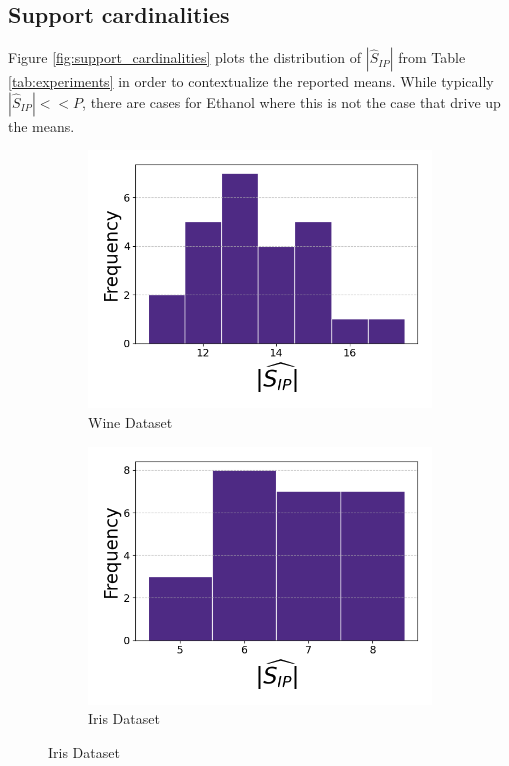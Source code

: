 \newpage

\subsection{Support cardinalities}
\label{sec:support_cardinalities}

Figure \ref{fig:support_cardinalities} plots the distribution of $|\widehat{S}_{IP}|$ from Table \ref{tab:experiments} in order to contextualize the reported means.
While typically $|\widehat{S}_{IP}| << P$, there are cases for Ethanol where this is not the case that drive up the means.

\begin{figure}[t]
    \centering
    \begin{subfigure}[b]{0.45\textwidth}
        \centering
        \includegraphics[width=\textwidth]{../figures/wine_cardinalities}
        \caption{Wine Dataset}
        \label{fig:wine_cardinalities}
    \end{subfigure}
    \hfill
    \begin{subfigure}[b]{0.45\textwidth}
        \centering
        \includegraphics[width=\textwidth]{../figures/iris_cardinalities}
        \caption{Iris Dataset}
        \label{fig:iris_cardinalities}
    \end{subfigure}


\end{figure}
